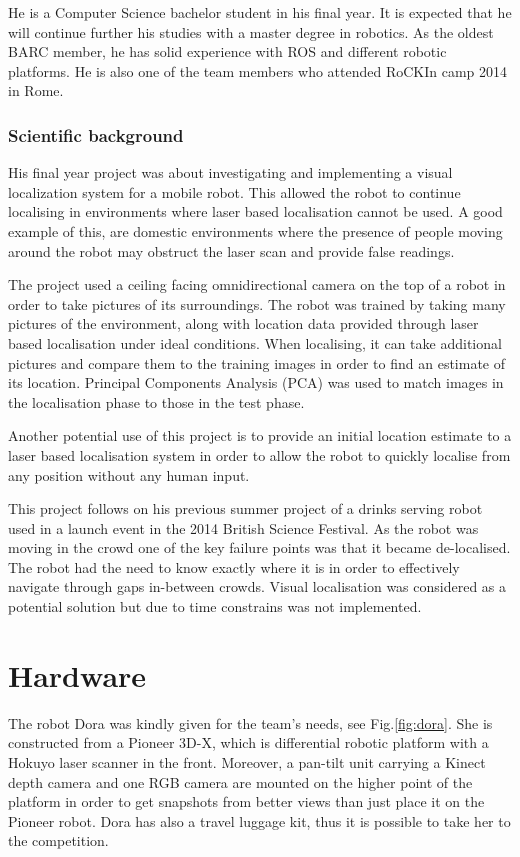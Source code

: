 \documentclass[conference]{IEEEtran}
\begin{document}
He is a Computer Science bachelor student in his final year. It is expected that he will continue further his studies with a master degree in robotics. As the oldest BARC member, he has solid experience with ROS and different robotic platforms. He is also one of the team members who attended RoCKIn camp 2014 in Rome.

\subsubsection*{Scientific background}
 
His final year project was about investigating and implementing a visual localization system for a mobile robot. This allowed the robot to continue localising in environments where laser based localisation cannot be used. A good example of this, are domestic environments where the presence of people moving around the robot may obstruct the laser scan and provide false readings.
 
The project used a ceiling facing omnidirectional camera on the top of a robot in order to take pictures of its surroundings.
The robot was trained by taking many pictures of the environment, along with location data provided through laser based localisation under ideal conditions. When localising, it can take additional pictures and compare them to the training images in order to find an estimate of its location. Principal Components Analysis (PCA) was used to match images in the localisation phase to those in the test phase. 

Another potential use of this project is to provide an initial location estimate to a laser based localisation system in order to allow the robot to quickly localise from any position without any human input.

This project follows on his previous summer project of a drinks serving robot used in a launch event in the 2014 British Science Festival. As the robot was moving in the crowd one of the key failure points was that it became de-localised. The robot had the need to know exactly where it is in order to effectively navigate through gaps in-between crowds. Visual localisation was considered as a potential solution but due to time constrains was not implemented.

\section{\label{sec:hardware}Hardware}
The robot Dora was kindly given for the team's needs, see Fig.\ref{fig:dora}. She is constructed from a Pioneer 3D-X, which is differential robotic platform with a Hokuyo laser scanner in the front. Moreover, a pan-tilt unit carrying a Kinect depth camera and one RGB camera are mounted on the higher point of the platform in order to get snapshots from better views than just place it on the Pioneer robot. Dora has also a travel luggage kit, thus it is possible to take her to the competition.
\end{document}
